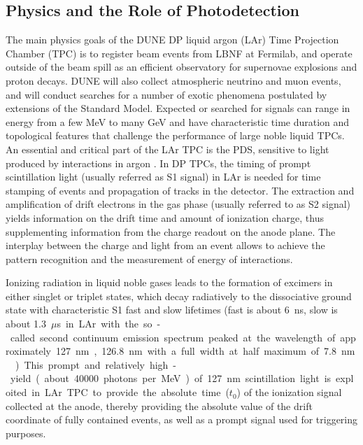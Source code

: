 \subsection{Physics and the Role of Photodetection}
\label{sec:fddp-pd-1.2}

The main physics goals of the DUNE DP liquid argon (LAr) Time Projection Chamber (TPC) is to register beam events from LBNF at Fermilab, and operate outside of the beam spill as an efficient observatory for supernovae explosions and proton decays. DUNE will also collect atmospheric neutrino and muon events, and will conduct searches for a number of exotic phenomena postulated by extensions of the Standard Model.  Expected or searched for signals can range in energy from a few MeV to many GeV and have characteristic time duration and topological features that challenge the performance of large noble liquid TPCs. An essential and critical part of the LAr TPC is the PDS, sensitive to light produced by interactions in argon \cite{Cuesta:2017nrs}. In DP TPCs, the timing of prompt scintillation light (usually referred as S1 signal) in LAr is needed for time stamping of events and propagation of tracks in the detector. The extraction and amplification of drift electrons in the gas phase (usually referred to as S2 signal) yields information on the drift time and amount of ionization charge, thus supplementing information from the charge readout on the anode plane. The interplay between the charge and light from an event allows to achieve the pattern recognition and the measurement of energy of interactions.

Ionizing radiation in liquid noble gases leads to the formation of excimers in either singlet or triplet states, which decay radiatively to the dissociative ground state with characteristic S1 fast and slow lifetimes (fast is about \SI{6}{ns}, slow is about \SI{1.3}{$\mu$s} in LAr with the so-called second continuum emission spectrum peaked at the wavelength of approximately \SI{127}{nm}, \SI{126.8}{nm} with a full width at half maximum of \SI{7.8}{nm} \cite{Heindl}). This prompt and relatively high-yield (about \num{40000} photons per MeV) of \SI{127}{nm} scintillation light is exploited in LAr TPC to provide the absolute time ($t_0$) of the ionization signal collected at the anode, thereby providing the absolute value of the drift coordinate of fully contained events, as well as a prompt signal used for triggering purposes.


